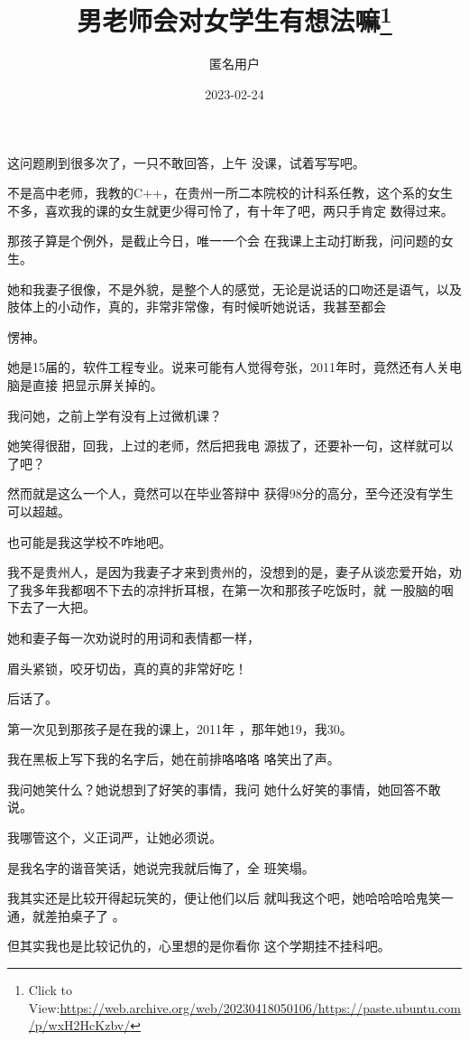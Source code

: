 \documentclass{article}
\title{男老师会对女学生有想法嘛\footnote{Click to View:\url{https://web.archive.org/web/20230418050106/https://paste.ubuntu.com/p/wxH2HcKzbv/}}}
\author{匿名用户}
\date{2023-02-24}
\begin{document}

\maketitle


\Large

﻿这问题刷到很多次了，一只不敢回答，上午
没课，试着写写吧。 

不是高中老师，我教的C++，在贵州一所二本院校的计科系任教，这个系的女生不多，喜欢我的课的女生就更少得可怜了，有十年了吧，两只手肯定
数得过来。 

那孩子算是个例外，是截止今日，唯一一个会
在我课上主动打断我，问问题的女生。 

她和我妻子很像，不是外貌，是整个人的感觉，无论是说话的口吻还是语气，以及肢体上的小动作，真的，非常非常像，有时候听她说话，我甚至都会

\newpage
愣神。 

她是15届的，软件工程专业。说来可能有人觉得夸张，2011年时，竟然还有人关电脑是直接
把显示屏关掉的。 


我问她，之前上学有没有上过微机课？ 

她笑得很甜，回我，上过的老师，然后把我电
源拔了，还要补一句，这样就可以了吧？ 

然而就是这么一个人，竟然可以在毕业答辩中
获得98分的高分，至今还没有学生可以超越。 


也可能是我这学校不咋地吧。 

我不是贵州人，是因为我妻子才来到贵州的，没想到的是，妻子从谈恋爱开始，劝了我多年我都咽不下去的凉拌折耳根，在第一次和那孩子吃饭时，就
一股脑的咽下去了一大把。 

她和妻子每一次劝说时的用词和表情都一样，
\newpage

眉头紧锁，咬牙切齿，真的真的非常好吃！ 


后话了。 


 

第一次见到那孩子是在我的课上，2011年
，那年她19，我30。 

我在黑板上写下我的名字后，她在前排咯咯咯
咯笑出了声。 

我问她笑什么？她说想到了好笑的事情，我问
她什么好笑的事情，她回答不敢说。 


我哪管这个，义正词严，让她必须说。 

是我名字的谐音笑话，她说完我就后悔了，全
班笑塌。 

我其实还是比较开得起玩笑的，便让他们以后
\newpage
就叫我这个吧，她哈哈哈哈鬼笑一通，就差拍桌子了
。 

但其实我也是比较记仇的，心里想的是你看你
这个学期挂不挂科吧。 
\end{document}
